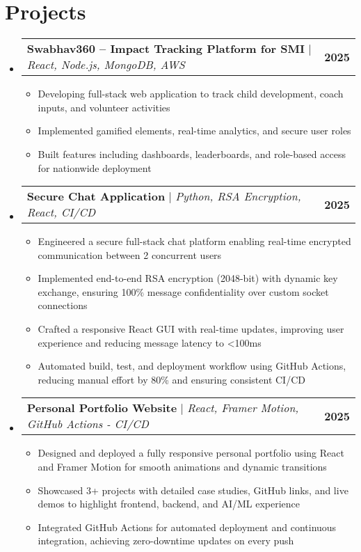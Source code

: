 \documentclass[letterpaper,11pt]{article}
\makeatletter
\newcommand{\resumeItem}[1]{
  \item\small{
    {#1 \vspace{-2pt}}
  }
}
\newcommand{\resumeProjectHeading}[2]{
    \item
    \begin{tabular*}{1.001\textwidth}{l@{\extracolsep{\fill}}r}
      \small#1 & \textbf{\small #2}\\
    \end{tabular*}\vspace{-7pt}
}
\newcommand{\resumeSubHeadingListStart}{\begin{itemize}[leftmargin=0.0in, label={}]}
\newcommand{\resumeSubHeadingListEnd}{\end{itemize}}
\newcommand{\resumeItemListStart}{\begin{itemize}}
\newcommand{\resumeItemListEnd}{\end{itemize}\vspace{-5pt}}
\makeatother
\begin{document}
\section{Projects}
    \vspace{-5pt}
    \resumeSubHeadingListStart
      \resumeProjectHeading
          {\textbf{Swabhav360 -- Impact Tracking Platform for SMI} $|$ \emph{React, Node.js, MongoDB, AWS}}{2025}
          \resumeItemListStart
            \resumeItem{Developing full-stack web application to track child development, coach inputs, and volunteer activities}
            \resumeItem{Implemented gamified elements, real-time analytics, and secure user roles}
            \resumeItem{Built features including dashboards, leaderboards, and role-based access for nationwide deployment}
          \resumeItemListEnd
          \vspace{-13pt}
      \resumeProjectHeading
          {\textbf{Secure Chat Application} $|$ \emph{Python, RSA Encryption, React, CI/CD}}{2025}
          \resumeItemListStart
            \resumeItem{Engineered a secure full-stack chat platform enabling real-time encrypted communication between 2 concurrent users}
            \resumeItem{Implemented end-to-end RSA encryption (2048-bit) with dynamic key exchange, ensuring 100\% message confidentiality over custom socket                              connections}
            \resumeItem{Crafted a responsive React GUI with real-time updates, improving user experience and reducing message latency to <100ms}
            \resumeItem{Automated build, test, and deployment workflow using GitHub Actions, reducing manual effort by 80\% and ensuring consistent CI/CD}
          \resumeItemListEnd 
          \vspace{-13pt}
      \resumeProjectHeading
          {\textbf{Personal Portfolio Website} $|$ \emph{React, Framer Motion, GitHub Actions - CI/CD}}{2025}
          \resumeItemListStart
            \resumeItem{Designed and deployed a fully responsive personal portfolio using React and Framer Motion for smooth animations and dynamic transitions}
            \resumeItem{Showcased 3+ projects with detailed case studies, GitHub links, and live demos to highlight frontend, backend, and AI/ML experience}
            \resumeItem{Integrated GitHub Actions for automated deployment and continuous integration, achieving zero-downtime updates on every push}
          \resumeItemListEnd
    \resumeSubHeadingListEnd
\vspace{-15pt}

\end{document}
